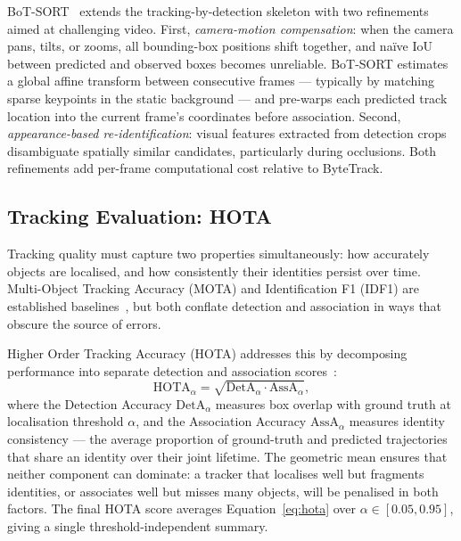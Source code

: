BoT-SORT~\cite{BoTSORT} extends the tracking-by-detection 
skeleton with two refinements aimed at challenging video. 
First, \emph{camera-motion compensation}: when the camera 
pans, tilts, or zooms, all bounding-box positions shift 
together, and naïve IoU between predicted and observed 
boxes becomes unreliable. BoT-SORT estimates a global 
affine transform between consecutive frames — typically by 
matching sparse keypoints in the static background — and 
pre-warps each predicted track location into the current 
frame's coordinates before association. Second, 
\emph{appearance-based re-identification}: visual features 
extracted from detection crops disambiguate spatially 
similar candidates, particularly during occlusions. Both 
refinements add per-frame computational cost relative to 
ByteTrack.

\subsection{Tracking Evaluation: HOTA}
\label{subsec:background_tracking_metrics}

Tracking quality must capture two properties simultaneously: 
how accurately objects are localised, and how consistently 
their identities persist over time. Multi-Object Tracking 
Accuracy (MOTA) and Identification F1 (IDF1) are established 
baselines~\cite{MOTChallenge2021}, but both conflate 
detection and association in ways that obscure the source 
of errors.

Higher Order Tracking Accuracy (HOTA) addresses this by 
decomposing performance into separate detection and 
association scores~\cite{HOTA2020}:
\begin{equation}
    \mathrm{HOTA}_\alpha =
    \sqrt{\mathrm{DetA}_\alpha \cdot \mathrm{AssA}_\alpha},
    \label{eq:hota}
\end{equation}
where the Detection Accuracy \(\mathrm{DetA}_\alpha\) measures box overlap with
ground truth at localisation threshold \(\alpha\), and the
Association Accuracy \(\mathrm{AssA}_\alpha\) measures identity consistency —
the average proportion of ground-truth and predicted 
trajectories that share an identity over their joint 
lifetime. The geometric mean ensures that neither component 
can dominate: a tracker that localises well but fragments 
identities, or associates well but misses many objects, 
will be penalised in both factors. The final HOTA score 
averages Equation~\ref{eq:hota} over 
\(\alpha \in [0.05, 0.95]\), giving a single 
threshold-independent summary.

